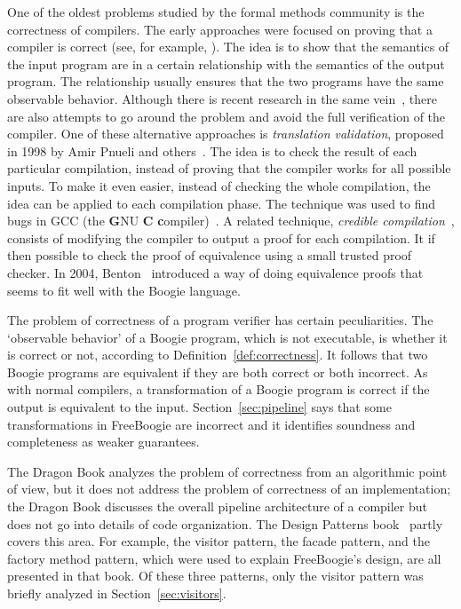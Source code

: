 \documentclass[a4paper]{article}
\def\fb#1{{\bf #1}} %
\theoremstyle{slanted}
\theoremstyle{definition}
\theoremstyle{remark}
\begin{document}
One of the oldest problems studied by the formal methods
community is the correctness of compilers. The early approaches
were focused on proving that a compiler is correct (see, for
example, \cite{moore1989cc}). The idea is to show that the
semantics of the input program are in a certain relationship
with the semantics of the output program. The relationship
usually ensures that the two programs have the same observable
behavior. Although there is recent research in the same
vein~\cite{leroy2009}, there are also attempts to go around the
problem and avoid the full verification of the compiler. One of
these alternative approaches is \emph{translation validation},
proposed in 1998 by Amir Pnueli and others~\cite{pnueli1998tv}.
The idea is to check the result of each particular compilation,
instead of proving that the compiler works for all possible
inputs. To make it even easier, instead of checking the whole
compilation, the idea can be applied to each compilation phase.
The technique was used to find bugs in GCC (the \fb GNU \fb
C \fb compiler)~\cite{necula2000tv}. A related technique,
\emph{credible compilation}~\cite{rinard1999credible}, consists
of modifying the compiler to output a proof for each compilation.
It if then possible to check the proof of equivalence using a
small trusted proof checker. In 2004, Benton~\cite{benton2004}
introduced a way of doing equivalence proofs that seems to
fit well with the Boogie language.

The problem of correctness of a program verifier has certain
peculiarities. The `observable behavior' of a Boogie program,
which is not executable, is whether it is correct or not,
according to Definition~\ref{def:correctness}. It follows that
two Boogie programs are equivalent if they are both correct or
both incorrect. As with normal compilers, a transformation of
a Boogie program is correct if the output is equivalent to the
input. Section~\ref{sec:pipeline} says that some transformations
in FreeBoogie are incorrect and it identifies soundness and
completeness as weaker guarantees.

The Dragon Book analyzes the problem of correctness from an
algorithmic point of view, but it does not address the problem
of correctness of an implementation; the Dragon Book discusses
the overall pipeline architecture of a compiler but does not
go into details of code organization. The Design Patterns
book~\cite{gamma1995} partly covers this area. For example, the
visitor pattern, the facade pattern, and the factory method
pattern, which were used to explain FreeBoogie's design, are all
presented in that book. Of these three patterns, only the visitor
pattern was briefly analyzed in Section~\ref{sec:visitors}.
\end{document}
